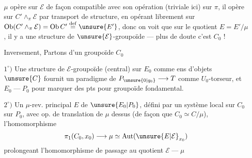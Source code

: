 $\mu$ opère sur $\mathcal E$ de façon compatible avec
son opération (triviale ici) sur $\pi$, il opère sur
$C'\mathbin{\wedge}_{\pi}\mathcal E$ par transport de structure, en opérant
librement sur $\operatorname{Ob}(C'\mathbin{\wedge}_{\pi}\mathcal E)=\operatorname{Ob}C'\overset{\mathrm{def}}{=}\unsure{E'}$, donc
on voit que sur le  quotient $E=E'/\mu$, il y
a une structure de $\unsure{\mathcal E}$-groupoïde ---
plus de doute c'est $C_0$ !

Inversement, Partons d'un groupoïde
$C_0$ 

$1^\circ)$ Une structure de $\mathcal E$-groupoïde (central)
sur $E_0$ comme ens d'objets
 $\unsure{C}$ fournit un paradigme de
$P_{\unsure{0|q_0}}\longrightarrow T$ comme $U_0$-torseur,
et $E_0\mathbin{\text{---}}P_0$ pour marquer des
pts pour groupoïde fondamental.

$2^\circ)$ Un \deleted{$\mu\longrightarrow$} $\mu$-rev. principal
 $E$
de $\unsure{E_0|P_0}$, défini par un système
local sur $C_0$ sur $P_0$, avec op. de
translation de $\mu$ dessus (de façon
que $C_0\simeq C/\mu$), l'homomorphisme
\[
\pi_1(C_0,x_0)\longrightarrow\mu\simeq\operatorname{Aut}(\unsure{E|\mathcal E}_{x_0})
\]
prolongeant
l'homomorphisme de passage
au quotient $\mathcal E\mathbin{\text{---}}\mu$

